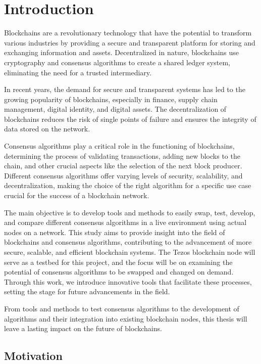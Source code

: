 \chapter{Introduction}
\label{chap:int}



Blockchains are a revolutionary technology that have the potential to transform various industries by providing a secure and transparent platform for storing and exchanging information and assets. Decentralized in nature, blockchains use cryptography and consensus algorithms to create a shared ledger system, eliminating the need for a trusted intermediary.

In recent years, the demand for secure and transparent systems has led to the growing popularity of blockchains, especially in finance, supply chain management, digital identity, and digital assets. The decentralization of blockchains reduces the risk of single points of failure and ensures the integrity of data stored on the network.

Consensus algorithms play a critical role in the functioning of blockchains, determining the process of validating transactions, adding new blocks to the chain, and other crucial aspects like the selection of the next block producer. Different consensus algorithms offer varying levels of security, scalability, and decentralization, making the choice of the right algorithm for a specific use case crucial for the success of a blockchain network.

The main objective is to develop tools and methods to easily swap, test, develop, and compare different consensus algorithms in a live environment using actual nodes on a network. This study aims to provide insight into the field of blockchains and consensus algorithms, contributing to the advancement of more secure, scalable, and efficient blockchain systems. The Tezos \cite{goodman2014tezos} blockchain node will serve as a testbed for this project, and the focus will be on examining the potential of consensus algorithms to be swapped and changed on demand. Through this work, we introduce innovative tools that facilitate these processes, setting the stage for future advancements in the field.

From tools and methods to test consensus algorithms to the development of algorithms and their integration into existing blockchain nodes, this thesis will leave a lasting impact on the future of blockchains.

\section{Motivation}

